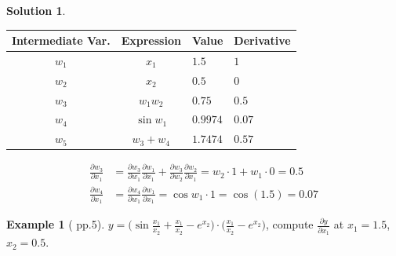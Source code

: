 \documentclass[10pt]{extarticle}
\newcommand{\ds}{\displaystyle}
\theoremstyle{definition}
\newtheorem*{ex}{Example}
\newtheorem*{sol}{Solution}
\begin{document}
\begin{sol}
  \leavevmode
  \vspace{3mm}
  \begin{center}
    \begin{tabular}{ccll}
      \toprule
      Intermediate Var. & Expression & Value & Derivative \\
      \midrule
      $w_1$ & $x_1$ & $1.5$ & $1$ \\
      $w_2$ & $x_2$ & $0.5$ & $0$ \\
      $w_3$ & $w_1 w_2$ & $0.75$ & $0.5$ \\
      $w_4$ & $\sin w_1$ & $0.9974$ & $0.07$ \\
      $w_5$ & $w_3 + w_4$ & $1.7474$ & $0.57$ \\
      \bottomrule
    \end{tabular}
  \end{center}
  \begin{align*}
    \frac{\partial w_3}{\partial x_1} &= \frac{\partial w_3}{\partial w_1}\frac{\partial w_1}{\partial x_1} + \frac{\partial w_3}{\partial w_2}\frac{\partial w_2}{\partial x_1} = w_2\cdot 1 + w_1\cdot 0 = 0.5 \\
    \frac{\partial w_4}{\partial x_1} &= \frac{\partial w_4}{\partial w_1}\frac{\partial w_1}{\partial x_1} = \cos w_1\cdot 1 = \cos(1.5) = 0.07
  \end{align*}
\end{sol}

\newpage

\begin{ex}[\citet{griewank} pp.5]
  $\ds y = \Big(\sin\frac{x_1}{x_2} + \frac{x_1}{x_2} - e^{x_2}\Big)\cdot\Big(\frac{x_1}{x_2} - e^{x_2}\Big)$, compute $\ds\frac{\partial y}{\partial x_1}$ at $x_1 = 1.5$, $x_2 = 0.5$.
\end{ex}
\end{document}
